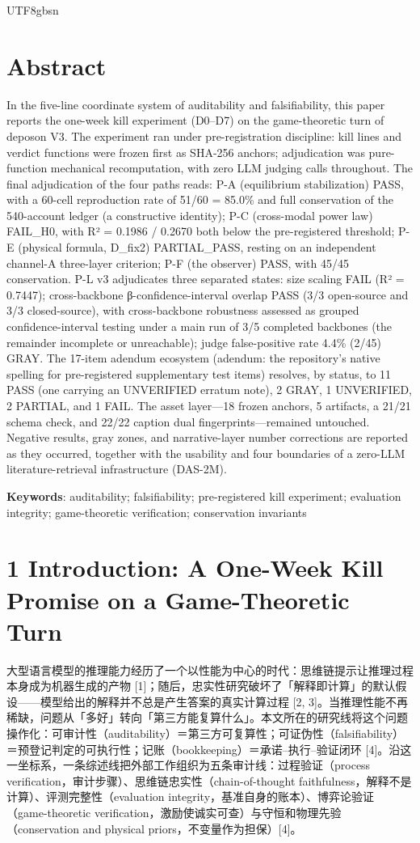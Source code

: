\documentclass[10pt,a4paper]{article}
\begin{document}
\begin{CJK}{UTF8}{gbsn}
\section*{Abstract}In the five-line coordinate system of auditability and falsifiability, this paper reports the one-week kill experiment (D0–D7) on the game-theoretic turn of deposon V3. The experiment ran under pre-registration discipline: kill lines and verdict functions were frozen first as SHA-256 anchors; adjudication was pure-function mechanical recomputation, with zero LLM judging calls throughout. The final adjudication of the four paths reads: P-A (equilibrium stabilization) PASS, with a 60-cell reproduction rate of 51/60 = 85.0\% and full conservation of the 540-account ledger (a constructive identity); P-C (cross-modal power law) FAIL\_H0, with R² = 0.1986 / 0.2670 both below the pre-registered threshold; P-E (physical formula, D\_fix2) PARTIAL\_PASS, resting on an independent channel-A three-layer criterion; P-F (the observer) PASS, with 45/45 conservation. P-L v3 adjudicates three separated states: size scaling FAIL (R² = 0.7447); cross-backbone β-confidence-interval overlap PASS (3/3 open-source and 3/3 closed-source), with cross-backbone robustness assessed as grouped confidence-interval testing under a main run of 3/5 completed backbones (the remainder incomplete or unreachable); judge false-positive rate 4.4\% (2/45) GRAY. The 17-item adendum ecosystem (adendum: the repository's native spelling for pre-registered supplementary test items) resolves, by status, to 11 PASS (one carrying an UNVERIFIED erratum note), 2 GRAY, 1 UNVERIFIED, 2 PARTIAL, and 1 FAIL. The asset layer—18 frozen anchors, 5 artifacts, a 21/21 schema check, and 22/22 caption dual fingerprints—remained untouched. Negative results, gray zones, and narrative-layer number corrections are reported as they occurred, together with the usability and four boundaries of a zero-LLM literature-retrieval infrastructure (DAS-2M).

\noindent \textbf{Keywords}: auditability; falsifiability; pre-registered kill experiment; evaluation integrity; game-theoretic verification; conservation invariants


\section*{1 Introduction: A One-Week Kill Promise on a Game-Theoretic Turn}大型语言模型的推理能力经历了一个以性能为中心的时代：思维链提示让推理过程本身成为机器生成的产物 [1]；随后，忠实性研究破坏了「解释即计算」的默认假设——模型给出的解释并不总是产生答案的真实计算过程 [2, 3]。当推理性能不再稀缺，问题从「多好」转向「第三方能复算什么」。本文所在的研究线将这个问题操作化：可审计性（auditability）＝第三方可复算性；可证伪性（falsifiability）＝预登记判定的可执行性；记账（bookkeeping）＝承诺–执行–验证闭环 [4]。沿这一坐标系，一条综述线把外部工作组织为五条审计线：过程验证（process verification，审计步骤）、思维链忠实性（chain-of-thought faithfulness，解释不是计算）、评测完整性（evaluation integrity，基准自身的账本）、博弈论验证（game-theoretic verification，激励使诚实可查）与守恒和物理先验（conservation and physical priors，不变量作为担保）[4]。


\end{CJK}
\end{document}
